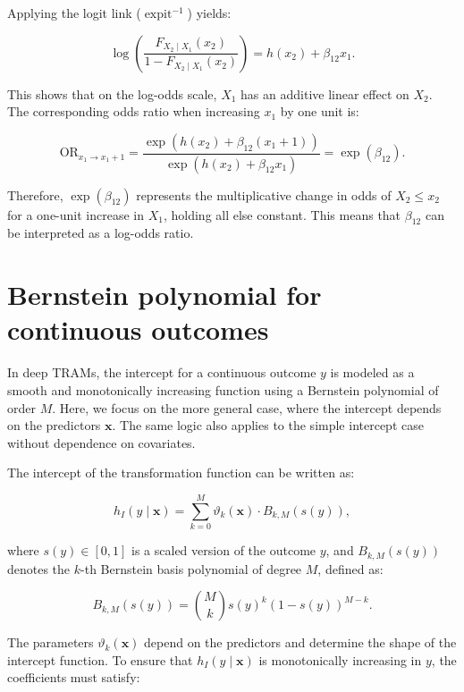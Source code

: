 Applying the logit link ($\operatorname{expit}^{-1}$) yields:

\begin{equation}
\log\left( \frac{F_{X_2 \mid X_1}(x_2)}{1 - F_{X_2 \mid X_1}(x_2)} \right)
= h(x_2) + \beta_{12} x_1.
\end{equation}


This shows that on the log-odds scale, $X_1$ has an additive linear effect on $X_2$. The corresponding odds ratio when increasing $x_1$ by one unit is:

\begin{equation}
\text{OR}_{x_1 \to x_1 + 1} = 
\frac{\exp(h(x_2) + \beta_{12}(x_1 + 1))}{\exp(h(x_2) + \beta_{12} x_1)} 
= \exp(\beta_{12}).
\end{equation}

Therefore, $\exp(\beta_{12})$ represents the multiplicative change in odds of $X_2 \le x_2$ for a one-unit increase in $X_1$, holding all else constant. This means that $\beta_{12}$ can be interpreted as a log-odds ratio.






\section{Bernstein polynomial for continuous outcomes} \label{sec:bernstein_polynomial}

In deep TRAMs, the intercept for a continuous outcome $y$ is modeled as a smooth and monotonically increasing function using a Bernstein polynomial of order $M$. Here, we focus on the more general case, where the intercept depends on the predictors $\mathbf{x}$. The same logic also applies to the simple intercept case without dependence on covariates.

The intercept of the transformation function can be written as:

\begin{equation}
h_I(y \mid \mathbf{x}) = \sum_{k=0}^{M} \vartheta_k(\mathbf{x}) \cdot B_{k, M}(s(y)),
\label{eq:bernstein_intercept}
\end{equation}

where $s(y) \in [0, 1]$ is a scaled version of the outcome $y$, and $B_{k, M}(s(y))$ denotes the $k$-th Bernstein basis polynomial of degree $M$, defined as:

\[
B_{k, M}(s(y)) = \binom{M}{k} s(y)^k (1 - s(y))^{M - k}.
\]

The parameters $\vartheta_k(\mathbf{x})$ depend on the predictors and determine the shape of the intercept function. To ensure that $h_I(y \mid \mathbf{x})$ is monotonically increasing in $y$, the coefficients must satisfy:

